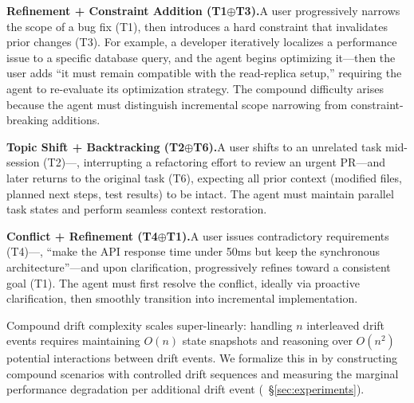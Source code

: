 \textbf{Refinement + Constraint Addition (T1$\oplus$T3).}\quad A user progressively narrows the scope of a bug fix (T1), then introduces a hard constraint that invalidates prior changes (T3). For example, a developer iteratively localizes a performance issue to a specific database query, and the agent begins optimizing it---then the user adds ``it must remain compatible with the read-replica setup,'' requiring the agent to re-evaluate its optimization strategy. The compound difficulty arises because the agent must distinguish incremental scope narrowing from constraint-breaking additions.

\textbf{Topic Shift + Backtracking (T2$\oplus$T6).}\quad A user shifts to an unrelated task mid-session (T2)---\eg, interrupting a refactoring effort to review an urgent PR---and later returns to the original task (T6), expecting all prior context (modified files, planned next steps, test results) to be intact. The agent must maintain parallel task states and perform seamless context restoration.

\textbf{Conflict + Refinement (T4$\oplus$T1).}\quad A user issues contradictory requirements (T4)---\eg, ``make the API response time under 50ms but keep the synchronous architecture''---and upon clarification, progressively refines toward a consistent goal (T1). The agent must first resolve the conflict, ideally via proactive clarification, then smoothly transition into incremental implementation.

Compound drift complexity scales super-linearly: handling $n$ interleaved drift events requires maintaining $O(n)$ state snapshots and reasoning over $O(n^2)$ potential interactions between drift events. We formalize this in \bench{} by constructing compound scenarios with controlled drift sequences and measuring the marginal performance degradation per additional drift event (\cf~\S\ref{sec:experiments}).
